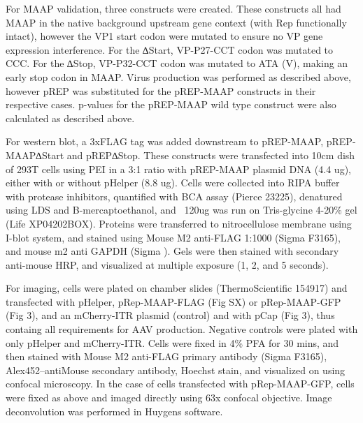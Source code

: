 For MAAP validation, three constructs were created. These constructs all had MAAP in the native background upstream gene context (with Rep functionally intact), however the VP1 start codon were mutated to ensure no VP gene expression interference. For the ∆Start, VP-P27-CCT codon was mutated to CCC. For the ∆Stop, VP-P32-CCT codon was mutated to ATA (V), making an early stop codon in MAAP. Virus production was performed as described above, however pREP was substituted for the pREP-MAAP constructs in their respective cases. p-values for the pREP-MAAP wild type construct were also calculated as described above. 

For western blot, a 3xFLAG tag was added downstream to pREP-MAAP, pREP-MAAP∆Start and pREP∆Stop. These constructs were transfected into 10cm dish of 293T cells using PEI in a 3:1 ratio with pREP-MAAP plasmid DNA (4.4 ug), either with or without pHelper (8.8 ug). Cells were collected into RIPA buffer with protease inhibitors, quantified with BCA assay (Pierce 23225), denatured using LDS and B-mercaptoethanol, and  ~120ug was run on Tris-glycine 4-20\% gel (Life XP04202BOX). Proteins were transferred to nitrocellulose membrane using I-blot system, and stained using Mouse M2 anti-FLAG 1:1000 (Sigma F3165), and mouse m2 anti GAPDH (Sigma ). Gels were then stained with secondary anti-mouse HRP, and visualized at multiple exposure (1, 2, and 5 seconds). 

For imaging, cells were plated on chamber slides (ThermoScientific 154917) and transfected with pHelper, pRep-MAAP-FLAG (Fig SX) or pRep-MAAP-GFP (Fig 3), and an mCherry-ITR plasmid (control) and with pCap (Fig 3), thus containg all requirements for AAV production. Negative controls were plated with only pHelper and mCherry-ITR. Cells were fixed in 4\% PFA for 30 mins, and then stained with Mouse M2 anti-FLAG primary antibody (Sigma F3165), Alex452–antiMouse secondary antibody, Hoechst stain, and visualized on using confocal microscopy. In the case of cells transfected with pRep-MAAP-GFP, cells were fixed as above and imaged directly using 63x confocal objective. Image deconvolution was performed in Huygens software. 


